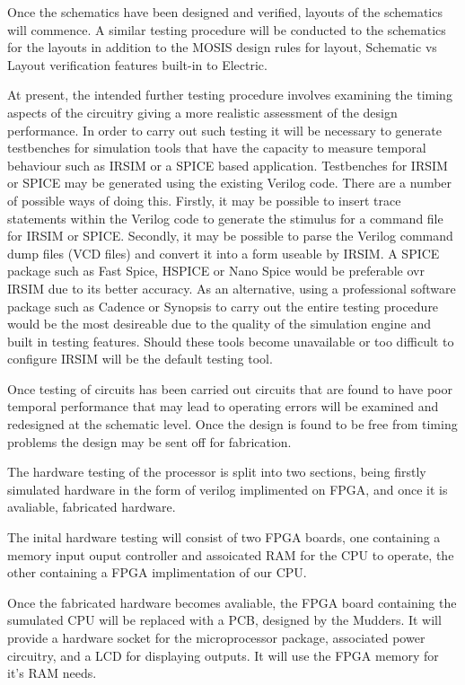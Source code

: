 Once the schematics have been designed and verified, layouts of the schematics will commence. A similar testing procedure will be conducted to the schematics for the layouts in addition to the MOSIS design rules for layout, Schematic vs Layout verification features built-in to Electric.

At present, the intended further testing procedure involves examining the timing aspects of the circuitry giving a more realistic assessment of the design performance. In order to carry out such testing it will be necessary to generate testbenches for simulation tools that have the capacity to measure temporal behaviour such as IRSIM or a SPICE based application. Testbenches for IRSIM or SPICE may be generated using the existing Verilog code. There are a number of possible ways of doing this. Firstly, it may be possible to insert trace statements within the Verilog code to generate the stimulus for a command file for IRSIM or SPICE. Secondly, it may be possible to parse the Verilog command dump files (VCD files) and convert it into a form useable by IRSIM. A SPICE package such as Fast Spice, HSPICE or Nano Spice would be preferable ovr IRSIM due to its better accuracy. As an alternative, using a professional software package such as Cadence or Synopsis to carry out the entire testing procedure would be the most desireable due to the quality of the simulation engine and built in testing features. Should these tools become unavailable or too difficult to configure IRSIM will be the default testing tool.

Once testing of circuits has been carried out circuits that are found to have poor temporal performance that may lead to operating errors will be examined and redesigned at the schematic level. Once the design is found to be free from timing problems the design may  be sent off for fabrication.

The hardware testing of the processor is split into two sections, being firstly simulated hardware in the form of verilog implimented on FPGA, and once it is avaliable, fabricated hardware.

The inital hardware testing will consist of two FPGA boards, one containing a memory input ouput controller and assoicated RAM for the CPU to operate, the other containing a FPGA implimentation of our CPU.

Once the fabricated hardware becomes avaliable, the FPGA board containing the sumulated CPU will be replaced with a PCB, designed by the Mudders. It will provide a hardware socket for the microprocessor package, associated power circuitry, and a LCD for displaying outputs. It will use the FPGA memory for it's RAM needs.

